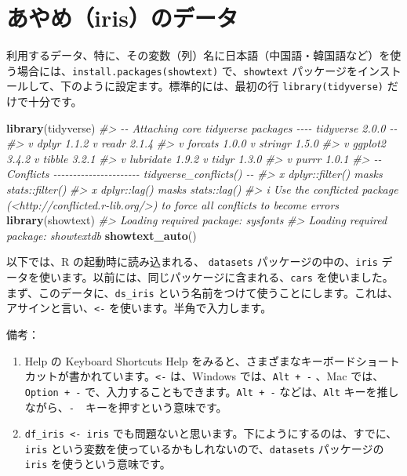 \documentclass[
  xelatex, ja=standard]{bxjsbook}
\newenvironment{Shaded}{\begin{snugshade}}{\end{snugshade}}
\newcommand{\CommentTok}[1]{\textcolor[rgb]{0.56,0.35,0.01}{\textit{#1}}}
\newcommand{\FunctionTok}[1]{\textcolor[rgb]{0.13,0.29,0.53}{\textbf{#1}}}
\newcommand{\NormalTok}[1]{#1}
\providecommand{\tightlist}{%
  \setlength{\itemsep}{0pt}\setlength{\parskip}{0pt}}
\theoremstyle{definition}
\theoremstyle{definition}
\theoremstyle{definition}
\theoremstyle{definition}
\theoremstyle{remark}
\begin{document}
\hypertarget{ux3042ux3084ux3081irisux306eux30c7ux30fcux30bf}{%
\section{あやめ（iris）のデータ}\label{ux3042ux3084ux3081irisux306eux30c7ux30fcux30bf}}

利用するデータ、特に、その変数（列）名に日本語（中国語・韓国語など）を使う場合には、\texttt{install.packages(\textquotesingle{}showtext\textquotesingle{})} で、\texttt{showtext} パッケージをインストールして、下のように設定ます。標準的には、最初の行 \texttt{library(tidyverse)} だけで十分です。

\begin{Shaded}
\begin{Highlighting}[]
\FunctionTok{library}\NormalTok{(tidyverse)}
\CommentTok{\#\textgreater{} {-}{-} Attaching core tidyverse packages {-}{-}{-}{-} tidyverse 2.0.0 {-}{-}}
\CommentTok{\#\textgreater{} v dplyr     1.1.2     v readr     2.1.4}
\CommentTok{\#\textgreater{} v forcats   1.0.0     v stringr   1.5.0}
\CommentTok{\#\textgreater{} v ggplot2   3.4.2     v tibble    3.2.1}
\CommentTok{\#\textgreater{} v lubridate 1.9.2     v tidyr     1.3.0}
\CommentTok{\#\textgreater{} v purrr     1.0.1     }
\CommentTok{\#\textgreater{} {-}{-} Conflicts {-}{-}{-}{-}{-}{-}{-}{-}{-}{-}{-}{-}{-}{-}{-}{-}{-}{-}{-}{-}{-}{-} tidyverse\_conflicts() {-}{-}}
\CommentTok{\#\textgreater{} x dplyr::filter() masks stats::filter()}
\CommentTok{\#\textgreater{} x dplyr::lag()    masks stats::lag()}
\CommentTok{\#\textgreater{} i Use the conflicted package (\textless{}http://conflicted.r{-}lib.org/\textgreater{}) to force all conflicts to become errors}
\FunctionTok{library}\NormalTok{(showtext) }
\CommentTok{\#\textgreater{} Loading required package: sysfonts}
\CommentTok{\#\textgreater{} Loading required package: showtextdb}
\FunctionTok{showtext\_auto}\NormalTok{()}
\end{Highlighting}
\end{Shaded}

以下では、R の起動時に読み込まれる、 \texttt{datasets} パッケージの中の、\texttt{iris} データを使います。以前には、同じパッケージに含まれる、\texttt{cars} を使いました。まず、このデータに、\texttt{ds\_iris} という名前をつけて使うことにします。これは、アサインと言い、\texttt{\textless{}-} を使います。半角で入力します。

備考：

\begin{enumerate}
\def\labelenumi{\arabic{enumi}.}
\tightlist
\item
  Help の Keyboard Shortcuts Help をみると、さまざまなキーボードショートカットが書かれています。\texttt{\textless{}-} は、Windows では、\texttt{Alt\ +\ -} 、Mac では、\texttt{Option\ +\ -} で、入力することもできます。\texttt{Alt\ +\ -} などは、\texttt{Alt} キーを推しながら、\texttt{-}　キーを押すという意味です。
\item
  \texttt{df\_iris\ \textless{}-\ iris} でも問題ないと思います。下にようにするのは、すでに、\texttt{iris} という変数を使っているかもしれないので、\texttt{datasets} パッケージの \texttt{iris} を使うという意味です。
\end{enumerate}
\end{document}
